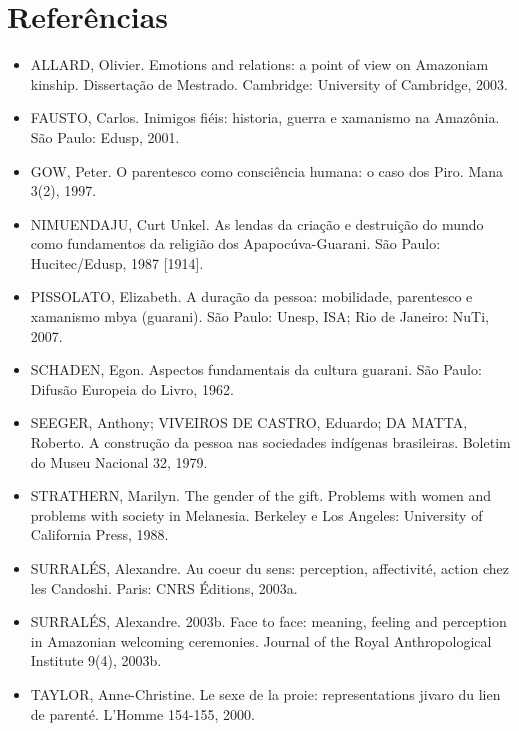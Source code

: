 \section{Referências}

\begin{itemize}
\item ALLARD, Olivier. Emotions and relations: a point of view on
Amazoniam kinship. Dissertação de Mestrado. Cambridge: University of
Cambridge, 2003.

\item FAUSTO, Carlos. Inimigos fiéis: historia, guerra e xamanismo na
Amazônia. São Paulo: Edusp, 2001.

\item GOW, Peter. O parentesco como consciência humana: o caso dos Piro.
Mana 3(2), 1997.

\item NIMUENDAJU, Curt Unkel. As lendas da criação e destruição do mundo
como fundamentos da religião dos Apapocúva-Guarani. São Paulo:
Hucitec/Edusp, 1987 [1914].

\item PISSOLATO, Elizabeth. A duração da pessoa: mobilidade, parentesco
e xamanismo mbya (guarani). São Paulo: Unesp, ISA; Rio de Janeiro:
NuTi, 2007.

\item SCHADEN, Egon. Aspectos fundamentais da cultura guarani. São
Paulo: Difusão Europeia do Livro, 1962.

\item SEEGER, Anthony; VIVEIROS DE CASTRO, Eduardo; DA MATTA, Roberto. A
construção da pessoa nas sociedades indígenas brasileiras. Boletim do
Museu Nacional 32, 1979.

\item STRATHERN, Marilyn. The gender of the gift. Problems with women
and problems with society in Melanesia. Berkeley e Los Angeles:
University of California Press, 1988.

\item SURRALÉS, Alexandre. Au coeur du sens: perception, affectivité,
action chez les Candoshi. Paris: CNRS Éditions, 2003a.

\item SURRALÉS, Alexandre. 2003b. Face to face: meaning, feeling and
perception in Amazonian welcoming ceremonies. Journal of the Royal
Anthropological Institute 9(4), 2003b.

\item TAYLOR, Anne-Christine. Le sexe de la proie: representations
jivaro du lien de parenté. L’Homme 154-155, 2000.


\end{itemize}
